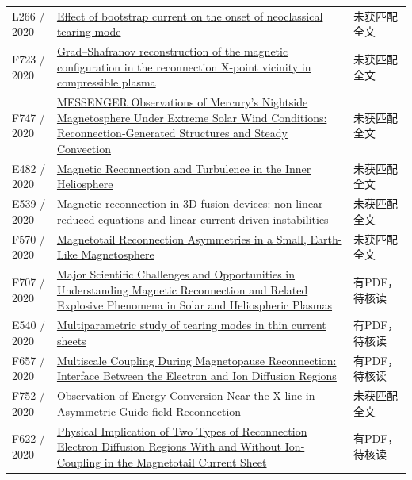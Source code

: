 \begin{longtable}{P{24mm}P{97mm}P{27mm}}
L266 / 2020 & \href{https://doi.org/10.1088/1741-4326/ab9564}{Effect of bootstrap current on the onset of neoclassical tearing mode} & 未获匹配全文\\

F723 / 2020 & \href{https://doi.org/10.1063/5.0015240}{Grad–Shafranov reconstruction of the magnetic configuration in the reconnection X-point vicinity in compressible plasma} & 未获匹配全文\\

F747 / 2020 & \href{https://doi.org/10.1029/2019ja027490}{MESSENGER Observations of Mercury's Nightside Magnetosphere Under Extreme Solar Wind Conditions: Reconnection‐Generated Structures and Steady Convection} & 未获匹配全文\\

E482 / 2020 & \href{https://escholarship.org/uc/item/0nv873w9}{Magnetic Reconnection and Turbulence in the Inner Heliosphere} & 未获匹配全文\\

E539 / 2020 & \href{https://doi.org/10.1088/1361-6587/abcab3}{Magnetic reconnection in 3D fusion devices: non-linear reduced equations and linear current-driven instabilities} & 未获匹配全文\\

F570 / 2020 & \href{https://doi.org/10.1002/essoar.10504213.1}{Magnetotail Reconnection Asymmetries in a Small,  Earth-Like Magnetosphere} & 未获匹配全文\\

F707 / 2020 & \href{https://doi.org/10.48550/arxiv.2009.08779}{Major Scientific Challenges and Opportunities in Understanding Magnetic Reconnection and Related Explosive Phenomena in Solar and Heliospheric Plasmas} & 有PDF，待核读\\

E540 / 2020 & \href{https://doi.org/10.1063/5.0022133}{Multiparametric study of tearing modes in thin current sheets} & 有PDF，待核读\\

F657 / 2020 & \href{https://doi.org/10.1029/2020ja027985}{Multiscale Coupling During Magnetopause Reconnection: Interface Between the Electron and Ion Diffusion Regions} & 有PDF，待核读\\

F752 / 2020 & \href{https://doi.org/10.3847/2041-8213/ab8e31}{Observation of Energy Conversion Near the X-line in Asymmetric Guide-field Reconnection} & 未获匹配全文\\

F622 / 2020 & \href{https://doi.org/10.1029/2020gl088761}{Physical Implication of Two Types of Reconnection Electron Diffusion Regions With and Without Ion‐Coupling in the Magnetotail Current Sheet} & 有PDF，待核读\\


\end{longtable}
